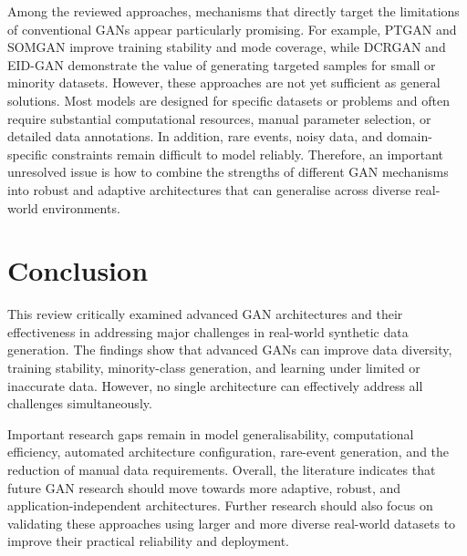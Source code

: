 \documentclass[12pt,a4paper]{article}
\begin{document}
Among the reviewed approaches, mechanisms that directly target the limitations of conventional GANs appear particularly promising. For example, PTGAN and SOMGAN improve training stability and mode coverage, while DCRGAN and EID-GAN demonstrate the value of generating targeted samples for small or minority datasets. However, these approaches are not yet sufficient as general solutions. Most models are designed for specific datasets or problems and often require substantial computational resources, manual parameter selection, or detailed data annotations. In addition, rare events, noisy data, and domain-specific constraints remain difficult to model reliably. Therefore, an important unresolved issue is how to combine the strengths of different GAN mechanisms into robust and adaptive architectures that can generalise across diverse real-world environments.



\section{Conclusion}

This review critically examined advanced GAN architectures and their effectiveness in addressing major challenges in real-world synthetic data generation. The findings show that advanced GANs can improve data diversity, training stability, minority-class generation, and learning under limited or inaccurate data. However, no single architecture can effectively address all challenges simultaneously.

Important research gaps remain in model generalisability, computational efficiency, automated architecture configuration, rare-event generation, and the reduction of manual data requirements. Overall, the literature indicates that future GAN research should move towards more adaptive, robust, and application-independent architectures. Further research should also focus on validating these approaches using larger and more diverse real-world datasets to improve their practical reliability and deployment.









\newpage

{}
\end{document}
